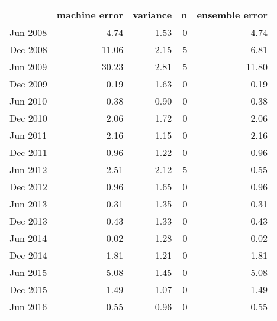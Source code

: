 \begin{tabular}{lrrrr}
\toprule
{} &  machine error &  variance &  n &  ensemble error \\
\midrule
Jun 2008 &           4.74 &      1.53 &  0 &            4.74 \\
Dec 2008 &          11.06 &      2.15 &  5 &            6.81 \\
Jun 2009 &          30.23 &      2.81 &  5 &           11.80 \\
Dec 2009 &           0.19 &      1.63 &  0 &            0.19 \\
Jun 2010 &           0.38 &      0.90 &  0 &            0.38 \\
Dec 2010 &           2.06 &      1.72 &  0 &            2.06 \\
Jun 2011 &           2.16 &      1.15 &  0 &            2.16 \\
Dec 2011 &           0.96 &      1.22 &  0 &            0.96 \\
Jun 2012 &           2.51 &      2.12 &  5 &            0.55 \\
Dec 2012 &           0.96 &      1.65 &  0 &            0.96 \\
Jun 2013 &           0.31 &      1.35 &  0 &            0.31 \\
Dec 2013 &           0.43 &      1.33 &  0 &            0.43 \\
Jun 2014 &           0.02 &      1.28 &  0 &            0.02 \\
Dec 2014 &           1.81 &      1.21 &  0 &            1.81 \\
Jun 2015 &           5.08 &      1.45 &  0 &            5.08 \\
Dec 2015 &           1.49 &      1.07 &  0 &            1.49 \\
Jun 2016 &           0.55 &      0.96 &  0 &            0.55 \\
\bottomrule
\end{tabular}
